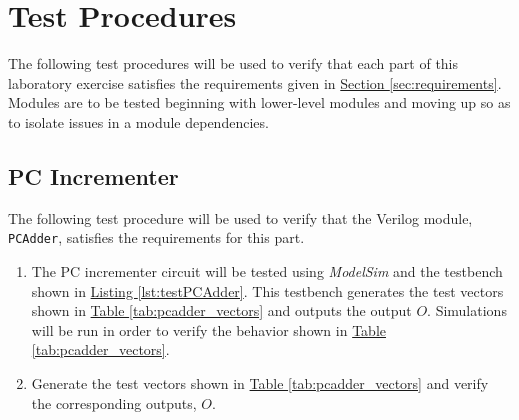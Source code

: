 \section{Test Procedures} %
\label{sec:test_procedures}

The following test procedures will be used to verify that each part of this laboratory exercise satisfies the requirements given in \hyperref[sec:requirements]{Section \ref*{sec:requirements}}.
Modules are to be tested beginning with lower-level modules and moving up so as to isolate issues in a module dependencies.

\subsection{PC Incrementer} %
\label{sub:pc_incrementer_procedure}

The following test procedure will be used to verify that the Verilog module, \verb|PCAdder|, satisfies the requirements for this part.

\begin{enumerate}
    \item The PC incrementer circuit will be tested using \emph{ModelSim} and the testbench shown in \hyperref[lst:testPCAdder]{Listing \ref*{lst:testPCAdder}}.
    This testbench generates the test vectors shown in \hyperref[tab:pcadder_vectors]{Table \ref*{tab:pcadder_vectors}} and outputs the output $O$.
    Simulations will be run in order to verify the behavior shown in \hyperref[tab:pcadder_vectors]{Table \ref*{tab:pcadder_vectors}}.
    \item Generate the test vectors shown in \hyperref[tab:pcadder_vectors]{Table \ref*{tab:pcadder_vectors}} and verify the corresponding outputs, $O$.
\end{enumerate}

